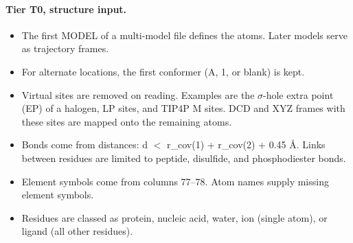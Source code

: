 \paragraph{Tier T0, structure input.}
\begin{itemize}[nosep,leftmargin=*]
\item The first MODEL of a multi-model file defines the atoms. Later models serve as trajectory frames.
\item For alternate locations, the first conformer (A, 1, or blank) is kept.
\item Virtual sites are removed on reading. Examples are the $\sigma$-hole extra point (EP) of a halogen, LP sites, and TIP4P M sites. DCD and XYZ frames with these sites are mapped onto the remaining atoms.
\item Bonds come from distances: d $<$ r\_cov(1) + r\_cov(2) + 0.45 \AA{}. Links between residues are limited to peptide, disulfide, and phosphodiester bonds.
\item Element symbols come from columns 77--78. Atom names supply missing element symbols.
\item Residues are classed as protein, nucleic acid, water, ion (single atom), or ligand (all other residues).
\end{itemize}
